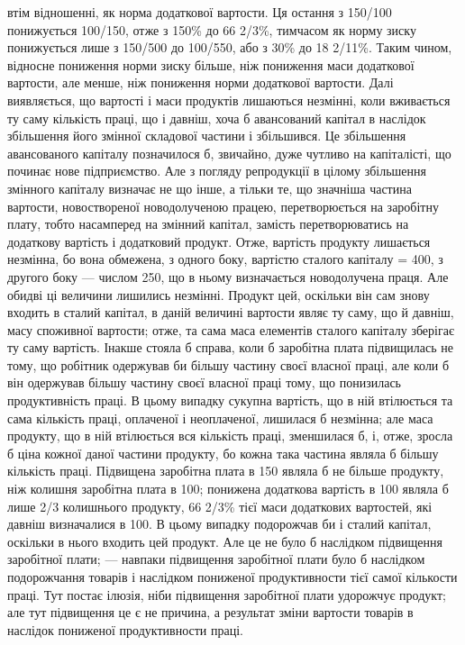 \parcont{}  %
втім відношенні, як норма додаткової вартости. Ця остання з 150/100 понижується
100/150, отже з 150\% до 66  2/3\%, тимчасом як норму зиску понижується
лише з 150/500 до 100/550, або з 30\% до 18 2/11\%. Таким чином, відносне пониження
норми зиску більше, ніж пониження маси додаткової вартости, але менше, ніж
пониження норми додаткової вартости. Далі виявляється, що вартості і маси продуктів
лишаються незмінні, коли вживається ту саму кількість праці, що і давніш,
хоча б авансований капітал в наслідок збільшення його змінної складової частини
і збільшився. Це збільшення авансованого капіталу позначилося б, звичайно,
дуже чутливо на капіталісті, що починає нове підприємство. Але з погляду
репродукції в цілому збільшення змінного капіталу визначає не що інше, а тільки
те, що значніша частина вартости, новоствореної новодолученою працею, перетворюється на заробітну
плату, тобто насамперед на змінний капітал, замість
перетворюватись на додаткову вартість і додатковий продукт. Отже, вартість
продукту лишається незмінна, бо вона обмежена, з одного боку, вартістю
сталого капіталу = 400, з другого боку — числом 250, що в ньому визначається
новодолучена праця. Але обидві ці величини лишились незмінні. Продукт цей,
оскільки він сам знову входить в сталий капітал, в даній величині вартости
являє ту саму, що й давніш, масу споживної вартости; отже, та сама маса
елементів сталого капіталу зберігає ту саму вартість. Інакше стояла б справа,
коли б заробітна плата підвищилась не тому, що робітник одержував би більшу
частину своєї власної праці, але коли б він одержував більшу частину своєї
власної праці тому, що понизилась продуктивність праці. В цьому випадку сукупна
вартість, що в ній втілюється та сама кількість праці, оплаченої і неоплаченої,
лишилася б незмінна; але маса продукту, що в ній втілюється вся
кількість праці, зменшилася б, і, отже, зросла б ціна кожної даної частини
продукту, бо кожна така частина являла б більшу кількість праці. Підвищена
заробітна плата в 150 являла б не більше продукту, ніж колишня заробітна
плата в 100; понижена додаткова вартість в 100 являла б лише 2/3 колишнього
продукту, 66  2/3\% тієї маси додаткових вартостей, які давніш визначалися
в 100. В цьому випадку подорожчав би і сталий капітал, оскільки в нього
входить цей продукт. Але це не було б наслідком підвищення заробітної плати;
— навпаки підвищення заробітної плати було б наслідком подорожчання
товарів і наслідком пониженої продуктивности тієї самої кількости праці. Тут
постає ілюзія, ніби підвищення заробітної плати удорожчує продукт; але тут
підвищення це є не причина, а результат зміни вартости товарів в наслідок
пониженої продуктивности праці.

